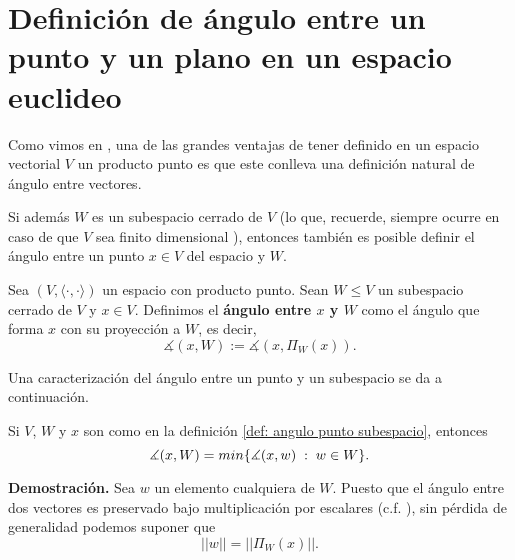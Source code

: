 \section{Definición de ángulo entre un punto y un plano en un espacio euclideo}

Como vimos en , una de las grandes ventajas de tener
definido en un espacio vectorial $V$ un producto punto es
que este conlleva una definición natural de ángulo entre
vectores.

Si además $W$ es un subespacio cerrado de $V$
(lo que, recuerde, siempre ocurre en caso de que
$V$ sea finito dimensional ), entonces también
es posible definir el ángulo entre un punto $x \in V$
del espacio y $W$.

\begin{defi} \label{def: angulo punto subespacio}
Sea $(V, \langle \cdot , \cdot \rangle)$ un espacio con 
producto punto. Sean $W \leq V$ un subespacio cerrado de $V$
y $x \in V$. Definimos el \textbf{ángulo entre $x$ y $W$}
como el ángulo que forma 
$x$ con su proyección a $W$, es decir,
\[
\measuredangle (x, W):= \measuredangle(x, \Pi_{W}(x)).
\]
\end{defi}

Una caracterización del ángulo entre un punto y un subespacio
se da a continuación.

\begin{prop}
Si $V$, $W$ y $x$ son como en la definición 
\ref{def: angulo punto subespacio}, entonces
\[
\measuredangle (x, W) = min \{ \measuredangle(x,w) \hspace{0.1cm} :
 \hspace{0.1cm} w \in W \}.
\]
\end{prop}
\noindent
\textbf{Demostración.}
Sea $w$ un elemento cualquiera de $W$.
Puesto que el ángulo entre dos vectores es
preservado bajo multiplicación por escalares
(c.f. ), sin pérdida de generalidad
podemos suponer que 
\begin{equation}
\label{eq1: 9Feb}
||w||= || \Pi_{W}(x)||.
\end{equation}

